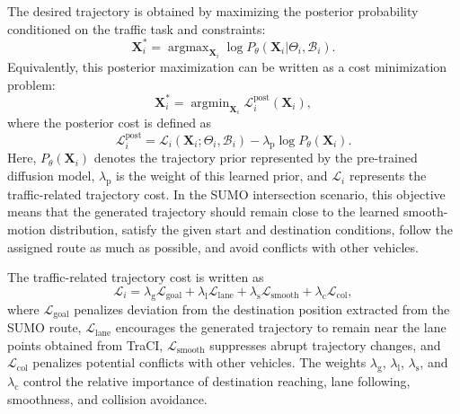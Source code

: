 \documentclass[journal]{IEEEtran}
\begin{document}
The desired trajectory is obtained by maximizing the posterior probability conditioned on the traffic task and constraints:
\begin{equation}
\mathbf{X}_i^{*}
=
\mathop{\arg\max}_{\mathbf{X}_i}
\log P_{\theta}(\mathbf{X}_i|\Theta_i,\mathcal{B}_i).
\label{eq_posterior_max}
\end{equation}
Equivalently, this posterior maximization can be written as a cost minimization problem:
\begin{equation}
\mathbf{X}_i^{*}
=
\mathop{\arg\min}_{\mathbf{X}_i}
\mathcal{L}_{i}^{\mathrm{post}}(\mathbf{X}_i),
\label{eq_posterior_min}
\end{equation}
where the posterior cost is defined as
\begin{equation}
\mathcal{L}_{i}^{\mathrm{post}}
=
\mathcal{L}_i(\mathbf{X}_i;\Theta_i,\mathcal{B}_i)
-
\lambda_{\mathrm{p}}\log P_{\theta}(\mathbf{X}_i).
\label{eq_dsip_objective}
\end{equation}
Here, $P_{\theta}(\mathbf{X}_i)$ denotes the trajectory prior represented by the pre-trained diffusion model, $\lambda_{\mathrm{p}}$ is the weight of this learned prior, and $\mathcal{L}_i$ represents the traffic-related trajectory cost. In the SUMO intersection scenario, this objective means that the generated trajectory should remain close to the learned smooth-motion distribution, satisfy the given start and destination conditions, follow the assigned route as much as possible, and avoid conflicts with other vehicles.

The traffic-related trajectory cost is written as
\begin{equation}
\mathcal{L}_i
=
\lambda_{\mathrm{g}}\mathcal{L}_{\mathrm{goal}}
+
\lambda_{\mathrm{l}}\mathcal{L}_{\mathrm{lane}}
+
\lambda_{\mathrm{s}}\mathcal{L}_{\mathrm{smooth}}
+
\lambda_{\mathrm{c}}\mathcal{L}_{\mathrm{col}},
\label{eq_total_loss}
\end{equation}
where $\mathcal{L}_{\mathrm{goal}}$ penalizes deviation from the destination position extracted from the SUMO route, $\mathcal{L}_{\mathrm{lane}}$ encourages the generated trajectory to remain near the lane points obtained from TraCI, $\mathcal{L}_{\mathrm{smooth}}$ suppresses abrupt trajectory changes, and $\mathcal{L}_{\mathrm{col}}$ penalizes potential conflicts with other vehicles. The weights $\lambda_{\mathrm{g}}$, $\lambda_{\mathrm{l}}$, $\lambda_{\mathrm{s}}$, and $\lambda_{\mathrm{c}}$ control the relative importance of destination reaching, lane following, smoothness, and collision avoidance.
\end{document}
